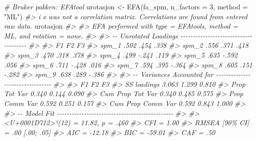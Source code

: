 \documentclass[
]{article}
\newenvironment{Shaded}{\begin{snugshade}}{\end{snugshade}}
\newcommand{\AttributeTok}[1]{\textcolor[rgb]{0.77,0.63,0.00}{#1}}
\newcommand{\CommentTok}[1]{\textcolor[rgb]{0.56,0.35,0.01}{\textit{#1}}}
\newcommand{\DecValTok}[1]{\textcolor[rgb]{0.00,0.00,0.81}{#1}}
\newcommand{\FunctionTok}[1]{\textcolor[rgb]{0.00,0.00,0.00}{#1}}
\newcommand{\NormalTok}[1]{#1}
\newcommand{\OtherTok}[1]{\textcolor[rgb]{0.56,0.35,0.01}{#1}}
\newcommand{\StringTok}[1]{\textcolor[rgb]{0.31,0.60,0.02}{#1}}
\begin{document}
\begin{Shaded}
\begin{Highlighting}[]
\CommentTok{\# Bruker pakken: EFAtool}
\NormalTok{urotasjon }\OtherTok{\textless{}{-}} \FunctionTok{EFA}\NormalTok{(fa\_spm, }\AttributeTok{n\_factors =} \DecValTok{3}\NormalTok{, }\AttributeTok{method =} \StringTok{"ML"}\NormalTok{)}
\CommentTok{\#\textgreater{} i \textquotesingle{}x\textquotesingle{} was not a correlation matrix. Correlations are found from entered raw data.}
\NormalTok{urotasjon}
\CommentTok{\#\textgreater{} }
\CommentTok{\#\textgreater{} EFA performed with type = \textquotesingle{}EFAtools\textquotesingle{}, method = \textquotesingle{}ML\textquotesingle{}, and rotation = \textquotesingle{}none\textquotesingle{}.}
\CommentTok{\#\textgreater{} }
\CommentTok{\#\textgreater{} {-}{-} Unrotated Loadings {-}{-}{-}{-}{-}{-}{-}{-}{-}{-}{-}{-}{-}{-}{-}{-}{-}{-}{-}{-}{-}{-}{-}{-}{-}{-}{-}{-}{-}{-}{-}{-}{-}{-}{-}{-}{-}{-}}
\CommentTok{\#\textgreater{} }
\CommentTok{\#\textgreater{}           F1      F2      F3  }
\CommentTok{\#\textgreater{} spm\_1     .502    .454    .338}
\CommentTok{\#\textgreater{} spm\_2     .556    .371    .418}
\CommentTok{\#\textgreater{} spm\_3     .470    .318    .378}
\CommentTok{\#\textgreater{} spm\_4     .499   {-}.241    .119}
\CommentTok{\#\textgreater{} spm\_5     .635   {-}.592    .056}
\CommentTok{\#\textgreater{} spm\_6     .711   {-}.428    .016}
\CommentTok{\#\textgreater{} spm\_7     .594    .395   {-}.364}
\CommentTok{\#\textgreater{} spm\_8     .605    .151   {-}.282}
\CommentTok{\#\textgreater{} spm\_9     .638    .289   {-}.386}
\CommentTok{\#\textgreater{} }
\CommentTok{\#\textgreater{} {-}{-} Variances Accounted for {-}{-}{-}{-}{-}{-}{-}{-}{-}{-}{-}{-}{-}{-}{-}{-}{-}{-}{-}{-}{-}{-}{-}{-}{-}{-}{-}{-}{-}{-}{-}{-}{-}}
\CommentTok{\#\textgreater{} }
\CommentTok{\#\textgreater{}                       F1      F2      F3  }
\CommentTok{\#\textgreater{} SS loadings           3.063   1.299   0.810}
\CommentTok{\#\textgreater{} Prop Tot Var          0.340   0.144   0.090}
\CommentTok{\#\textgreater{} Cum Prop Tot Var      0.340   0.485   0.575}
\CommentTok{\#\textgreater{} Prop Comm Var         0.592   0.251   0.157}
\CommentTok{\#\textgreater{} Cum Prop Comm Var     0.592   0.843   1.000}
\CommentTok{\#\textgreater{} }
\CommentTok{\#\textgreater{} {-}{-} Model Fit {-}{-}{-}{-}{-}{-}{-}{-}{-}{-}{-}{-}{-}{-}{-}{-}{-}{-}{-}{-}{-}{-}{-}{-}{-}{-}{-}{-}{-}{-}{-}{-}{-}{-}{-}{-}{-}{-}{-}{-}{-}{-}{-}{-}{-}{-}{-}}
\CommentTok{\#\textgreater{} }
\CommentTok{\#\textgreater{} \textless{}U+0001D712\textgreater{}²(12) = 11.82, p = .460}
\CommentTok{\#\textgreater{} CFI = 1.00}
\CommentTok{\#\textgreater{} RMSEA [90\% CI] = .00 [.00; .05]}
\CommentTok{\#\textgreater{} AIC = {-}12.18}
\CommentTok{\#\textgreater{} BIC = {-}59.01}
\CommentTok{\#\textgreater{} CAF = .50}
\end{Highlighting}
\end{Shaded}
\end{document}
